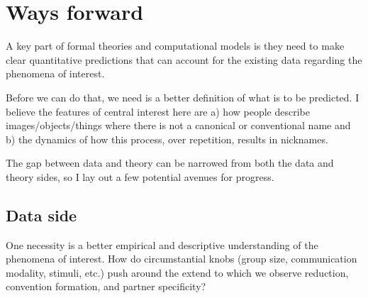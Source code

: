\documentclass[]{article}
\begin{document}
\section{Ways forward}



	
	A key part of formal theories and computational models is they need to make clear quantitative predictions that can account for the existing data regarding the phenomena of interest. 
	
	
	Before we can do that, we need is a better definition of what is to be predicted. I believe the features of central interest here are a) how people describe images/objects/things where there is not a canonical or conventional name and b) the dynamics of how this process, over repetition, results in nicknames. %
	
 The gap between data and theory can be narrowed from both the data and theory sides, so I lay out a few potential avenues for progress. 

\subsection{Data side}
	
	One necessity is a better empirical and descriptive understanding of the phenomena of interest. How do circumstantial knobs (group size, communication modality, stimuli, etc.) push around the extend to which we observe reduction, convention formation, and partner specificity? 
	
\end{document}

